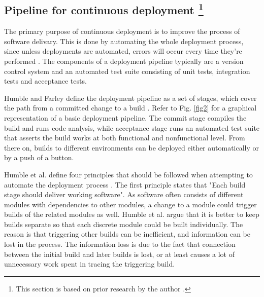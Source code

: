 \documentclass[conference]{IEEEtran}
\begin{document}
\subsection{Pipeline for continuous deployment \footnote{This section is based on prior research by the author \cite{arch14}.}}	

The primary purpose of continuous deployment is to improve the process of software delivary. This is done by automating the whole deployment process, since unless deployments are automated, errors will occur every time they're performed \cite{cdbook}. The components of a deployment pipeline typically are a version control system and an automated test suite consisting of unit tests, integration tests and acceptance tests. 

Humble and Farley define the deployment pipeline as a set of stages, which cover the path from a committed change to a build \cite{cdbook}. Refer to Fig. \ref{fig2} for a graphical representation of a basic deployment pipeline. The commit stage compiles the build and runs code analysis, while acceptance stage runs an automated test suite that asserts the build works at both functional and nonfunctional level. From there on, builds to different environments can be deployed either automatically or by a push of a button.

Humble et al. define four principles that should be followed when attempting to automate the deployment process \cite{humble2006deployment}. The first principle states that "Each build stage should deliver working software". As software often consists of different modules with dependencies to other modules, a change to a module could trigger builds of the related modules as well. Humble et al. argue that it is better to keep builds separate so that each discrete module could be built individually. The reason is that triggering other builds can be inefficient, and information can be lost in the process. The information loss is due to the fact that connection between the initial build and later builds is lost, or at least causes a lot of unnecessary work spent in tracing the triggering build. 
\end{document}
